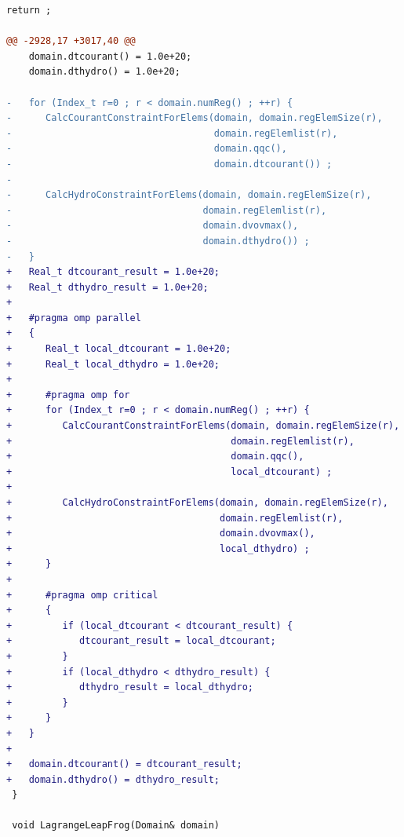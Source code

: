 \begin{lstlisting}[language=diff,basicstyle=\ttfamily\scriptsize,breaklines=true,caption={llnl_c1/lulesh — BROKEN (e6c_r2)}]
    return ;
 
@@ -2928,17 +3017,40 @@
    domain.dtcourant() = 1.0e+20;
    domain.dthydro() = 1.0e+20;
 
-   for (Index_t r=0 ; r < domain.numReg() ; ++r) {
-      CalcCourantConstraintForElems(domain, domain.regElemSize(r),
-                                    domain.regElemlist(r),
-                                    domain.qqc(),
-                                    domain.dtcourant()) ;
-
-      CalcHydroConstraintForElems(domain, domain.regElemSize(r),
-                                  domain.regElemlist(r),
-                                  domain.dvovmax(),
-                                  domain.dthydro()) ;
-   }
+   Real_t dtcourant_result = 1.0e+20;
+   Real_t dthydro_result = 1.0e+20;
+
+   #pragma omp parallel
+   {
+      Real_t local_dtcourant = 1.0e+20;
+      Real_t local_dthydro = 1.0e+20;
+
+      #pragma omp for
+      for (Index_t r=0 ; r < domain.numReg() ; ++r) {
+         CalcCourantConstraintForElems(domain, domain.regElemSize(r),
+                                       domain.regElemlist(r),
+                                       domain.qqc(),
+                                       local_dtcourant) ;
+
+         CalcHydroConstraintForElems(domain, domain.regElemSize(r),
+                                     domain.regElemlist(r),
+                                     domain.dvovmax(),
+                                     local_dthydro) ;
+      }
+
+      #pragma omp critical
+      {
+         if (local_dtcourant < dtcourant_result) {
+            dtcourant_result = local_dtcourant;
+         }
+         if (local_dthydro < dthydro_result) {
+            dthydro_result = local_dthydro;
+         }
+      }
+   }
+
+   domain.dtcourant() = dtcourant_result;
+   domain.dthydro() = dthydro_result;
 }
 
 void LagrangeLeapFrog(Domain& domain)
\end{lstlisting}
